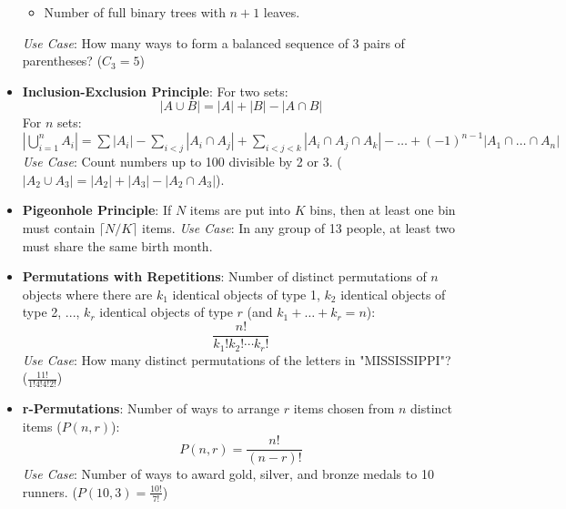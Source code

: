 \begin{itemize}
\begin{itemize}
            \item Number of full binary trees with $n+1$ leaves.
        \end{itemize}
        \textit{Use Case}: How many ways to form a balanced sequence of 3 pairs of parentheses? ($C_3 = 5$)
    \item \textbf{Inclusion-Exclusion Principle}:
        For two sets:
        \[
        |A \cup B| = |A| + |B| - |A \cap B|
        \]
        For $n$ sets:
        $|\bigcup_{i=1}^n A_i| = \sum |A_i| - \sum_{i<j} |A_i \cap A_j| + \sum_{i<j<k} |A_i \cap A_j \cap A_k| - \dots + (-1)^{n-1} |A_1 \cap \dots \cap A_n|$
        \textit{Use Case}: Count numbers up to 100 divisible by 2 or 3. ($|A_2 \cup A_3| = |A_2| + |A_3| - |A_2 \cap A_3|$).
    \item \textbf{Pigeonhole Principle}:
        If $N$ items are put into $K$ bins, then at least one bin must contain $\lceil N/K \rceil$ items.
        \textit{Use Case}: In any group of 13 people, at least two must share the same birth month.
    \item \textbf{Permutations with Repetitions}:
        Number of distinct permutations of $n$ objects where there are $k_1$ identical objects of type 1, $k_2$ identical objects of type 2, ..., $k_r$ identical objects of type $r$ (and $k_1 + \dots + k_r = n$):
        \[
        \frac{n!}{k_1!k_2! \cdots k_r!}
        \]
        \textit{Use Case}: How many distinct permutations of the letters in "MISSISSIPPI"? ($\frac{11!}{1!4!4!2!}$)
    \item \textbf{r-Permutations}:
        Number of ways to arrange $r$ items chosen from $n$ distinct items ($P(n, r)$):
        \[
        P(n, r) = \frac{n!}{(n - r)!}
        \]
        \textit{Use Case}: Number of ways to award gold, silver, and bronze medals to 10 runners. ($P(10, 3) = \frac{10!}{7!}$)
\end{itemize}
